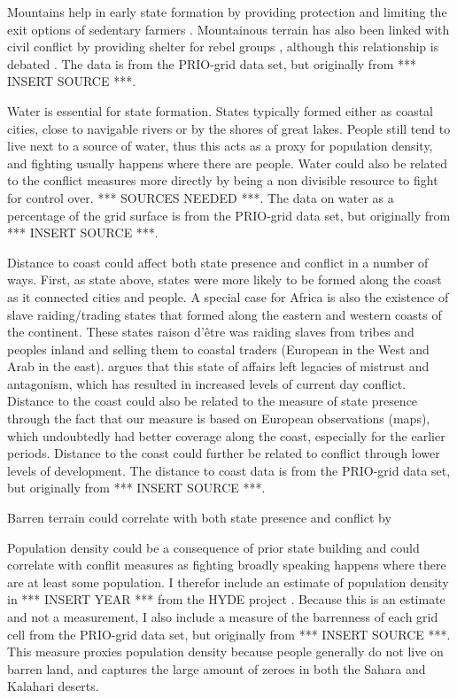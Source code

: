 \documentclass[12pt]{article}
\begin{document}
\begin{multicols}{2}
Mountains help in early state formation by providing protection and limiting the
exit options of sedentary farmers \citep{Carneiro1988}. Mountainous terrain has
also been linked with civil conflict by providing shelter for rebel groups
\citep{Hegre2006}, although this relationship is debated 
\citep{Buhaug2002}. The data is from the PRIO-grid data set, but originally 
from *** INSERT SOURCE ***.

Water is essential for state formation. States typically formed either as
coastal cities, close to navigable rivers or by the shores of great lakes.
People still tend to live next to a source of water, thus this acts as a proxy
for population density, and fighting usually happens where there are people.
Water could also be related to the conflict measures more directly by being a
non divisible resource to fight for control over. *** SOURCES NEEDED ***. The
data on water as a percentage of the grid surface is from the PRIO-grid data
set, but originally from *** INSERT SOURCE ***.

Distance to coast could affect both state presence and conflict in a number of
ways. First, as state above, states were more likely to be formed along the
coast as it connected cities and people. A special case for Africa is also the
existence of slave raiding/trading states that formed along the eastern and
western coasts of the continent. These states raison d'être was raiding slaves
from tribes and peoples inland and selling them to coastal traders (European in
the West and Arab in the east). \citet{Nunn2008} argues that this state of
affairs left legacies of mistrust and antagonism, which has resulted in
increased levels of current day conflict. Distance to the coast could also be
related to the measure of state presence through the fact that our measure is
based on European observations (maps), which undoubtedly had better coverage
along the coast, especially for the earlier periods. Distance to the coast could
further be related to conflict through lower levels of development. The distance
to coast data is from the PRIO-grid data set, but originally from *** INSERT
SOURCE ***.

Barren terrain could correlate with both state presence and conflict by 

Population density could be a consequence of prior state building and could
correlate with conflit measures as fighting broadly speaking happens where there
are at least some population. I therefor include an estimate of population
density in *** INSERT YEAR *** from the HYDE project \citep{Goldewijk2016}.
Because this is an estimate and not a measurement, I also include a measure of
the barrenness of each grid cell from the PRIO-grid data set, but originally
from *** INSERT SOURCE ***. This measure proxies population density because
people generally do not live on barren land, and captures the large amount of
zeroes in both the Sahara and Kalahari deserts.


\end{multicols}
\end{document}
